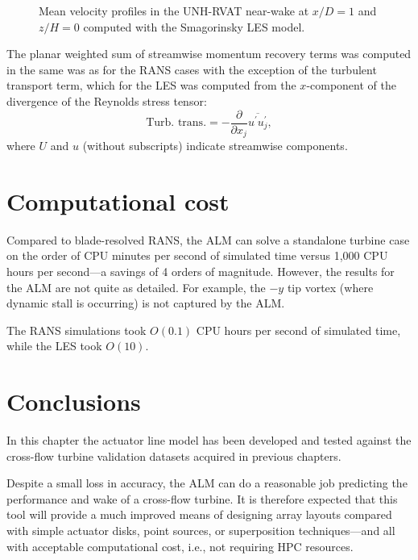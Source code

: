 \begin{figure}
    \centering
    
    \caption{Mean velocity profiles in the UNH-RVAT near-wake at $x/D=1$ and
        $z/H=0$ computed with the Smagorinsky LES model.}
    
    \label{fig:RVAT-ALM-LES-profiles}
\end{figure}

The planar weighted sum of streamwise momentum recovery terms was computed in
the same was as for the RANS cases with the exception of the turbulent transport
term, which for the LES was computed from the $x$-component of the divergence of
the Reynolds stress tensor:
\begin{equation}
    \text{Turb. trans.} = -\frac{\partial}{\partial x_j}
    \overline{u^\prime u^\prime_j},
\end{equation}
where $U$ and $u$ (without subscripts) indicate streamwise components.



\section{Computational cost}


Compared to blade-resolved RANS, the ALM can solve a standalone turbine case on
the order of CPU minutes per second of simulated time versus 1,000 CPU hours per
second---a savings of 4 orders of magnitude. However, the results for the ALM
are not quite as detailed. For example, the $-y$ tip vortex (where dynamic stall
is occurring) is not captured by the ALM.

The RANS simulations took $O(0.1)$ CPU hours per second of simulated time, while
the LES took $O(10)$.


\section{Conclusions}

In this chapter the actuator line model has been developed and tested against
the cross-flow turbine validation datasets acquired in previous chapters.

Despite a small loss in accuracy, the ALM can do a reasonable job predicting the
performance and wake of a cross-flow turbine. It is therefore expected that this
tool will provide a much improved means of designing array layouts compared with
simple actuator disks, point sources, or superposition techniques---and all with
acceptable computational cost, i.e., not requiring HPC resources.

